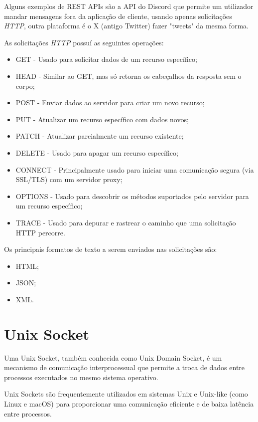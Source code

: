 Alguns exemplos de REST APIs são a API do Discord que permite um utilizador mandar mensagens fora
da aplicação de cliente, usando apenas solicitações \textit{HTTP}, outra plataforma é 
o X (antigo Twitter) fazer "tweets" da mesma forma.


As solicitações \textit{HTTP} possuí as seguintes operações:
\begin{itemize}
    \item GET - Usado para solicitar dados de um recurso específico;
    \item HEAD - Similar ao GET, mas só retorna os cabeçalhos da resposta sem o corpo;
    \item POST - Enviar dados ao servidor para criar um novo recurso; 
    \item PUT - Atualizar um recurso específico com dados novos;
    \item PATCH - Atualizar parcialmente um recurso existente; 
    \item DELETE - Usado para apagar um recurso específico; 
    \item CONNECT - Principalmente usado para iniciar uma comunicação
    segura (via SSL/TLS) com um servidor proxy; 
    \item OPTIONS - Usado para descobrir os métodos suportados pelo servidor para um recurso específico;
    \item TRACE - Usado para depurar e rastrear o caminho que uma solicitação HTTP percorre.
\end{itemize}


Os principais formatos de texto a serem enviados nas solicitações são:
\begin{itemize}
    \item HTML;
    \item JSON;
    \item XML.
\end{itemize}


\section{Unix Socket}

Uma Unix Socket, também conhecida como Unix Domain Socket, 
é um mecanismo de comunicação interprocessual  que permite a troca de dados 
entre processos executados no mesmo sistema operativo.

Unix Sockets são frequentemente utilizados em sistemas Unix e Unix-like
(como Linux e macOS) para proporcionar uma comunicação eficiente e de baixa 
latência entre processos.


